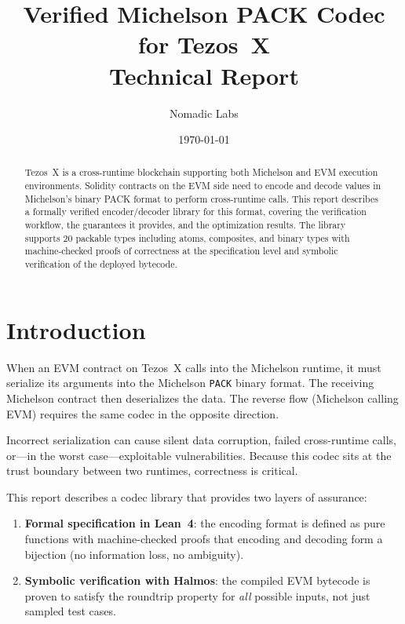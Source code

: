 \documentclass[11pt,a4paper]{article}
\title{\LARGE\textbf{Verified Michelson PACK Codec for Tezos~X}\\[0.3em]
\large Technical Report}
\author{Nomadic Labs}
\date{\today}
\begin{document}
\maketitle

\begin{abstract}
Tezos~X is a cross-runtime blockchain supporting both Michelson and EVM execution
environments. Solidity contracts on the EVM side need to encode and decode values
in Michelson's binary PACK format to perform cross-runtime calls. This report
describes a formally verified encoder/decoder library for this format, covering
the verification workflow, the guarantees it provides, and the optimization
results. The library supports 20 packable types including atoms, composites, and binary types with machine-checked proofs of
correctness at the specification level and symbolic verification of the deployed
bytecode.
\end{abstract}

\tableofcontents
\newpage

\section{Introduction}

When an EVM contract on Tezos~X calls into the Michelson runtime, it must
serialize its arguments into the Michelson \texttt{PACK} binary format. The
receiving Michelson contract then deserializes the data. The reverse flow
(Michelson calling EVM) requires the same codec in the opposite direction.

Incorrect serialization can cause silent data corruption, failed cross-runtime
calls, or---in the worst case---exploitable vulnerabilities. Because this codec
sits at the trust boundary between two runtimes, correctness is critical.

This report describes a codec library that provides two layers of assurance:

\begin{enumerate}
  \item \textbf{Formal specification in Lean~4}: the encoding format is defined
    as pure functions with machine-checked proofs that encoding and decoding form
    a bijection (no information loss, no ambiguity).
  \item \textbf{Symbolic verification with Halmos}: the compiled EVM bytecode is
    proven to satisfy the roundtrip property for \emph{all} possible inputs, not
    just sampled test cases.
\end{enumerate}
\end{document}

